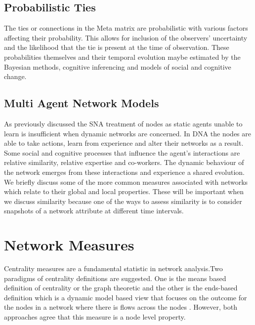 \subsection{Probabilistic Ties}

The ties or connections in the Meta matrix are probabilistic with various factors affecting their probability. This allows for inclusion of the observers’ uncertainty and the likelihood that the tie is present at the time of observation. These probabilities themselves and their temporal evolution maybe estimated by the Bayesian methods, cognitive inferencing and models of social and cognitive change. \citeauthor{Carley2001}

\subsection{Multi Agent Network Models}

As previously discussed the SNA treatment of nodes as static agents unable to learn is insufficient when dynamic networks are concerned. In DNA the nodes are able to take actions, learn from experience and alter their networks as a result. Some social and cognitive processes that influence the agent’s interactions are relative similarity, relative expertise and co-workers. The dynamic behaviour of the network emerges from these interactions and experience a shared evolution. \cite{Carley2001}\\

We briefly discuss some of the more common measures associated with networks which relate to their global and local properties. These will be important when we discuss similarity because one of the ways to assess similarity is to consider snapshots of a network attribute at different time intervals. 

\section{Network Measures}

Centrality measures are a fundamental statistic in network analysis.Two paradigms of centrality definitions are suggested. One is the means based definition of centrality or the graph theoretic and the other is the ends-based definition which is a dynamic model based view that focuses on the outcome for the nodes in a network where there is flows across the nodes . However, both approaches agree that this measure is a node level property. \cite{Borgatti2006, Borgatti2006b,Borgatti2005}\\

